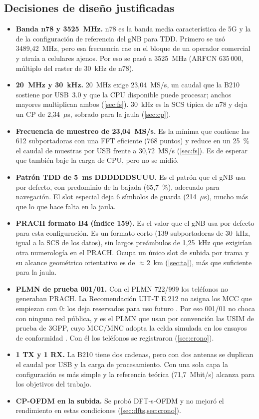 \subsection{Decisiones de diseño justificadas}
\begin{itemize}
  \item \textbf{Banda n78 y 3525~MHz.} n78 es la banda media característica de 5G y la de la configuración de referencia del gNB para TDD. Primero se usó 3489,42~MHz, pero esa frecuencia cae en el bloque de un operador comercial y atraía a celulares ajenos. Por eso se pasó a 3525~MHz (ARFCN 635\,000, múltiplo del raster de 30~kHz de n78).
  \item \textbf{20~MHz y 30~kHz.} 20~MHz exige 23,04~MS/s, un caudal que la B210 sostiene por USB~3.0 y que la CPU disponible puede procesar; anchos mayores multiplican ambos (\cref{sec:fs}). 30~kHz es la SCS típica de n78 y deja un CP de 2,34~$\mu$s, sobrado para la jaula (\cref{sec:cp}).
  \item \textbf{Frecuencia de muestreo de 23,04~MS/s.} Es la mínima que contiene las 612 subportadoras con una FFT eficiente (768 puntos) y reduce en un 25~\% el caudal de muestras por USB frente a 30,72~MS/s (\cref{sec:fs}). Es de esperar que también baje la carga de CPU, pero no se midió.
  \item \textbf{Patrón TDD de 5~ms DDDDDDSUUU.} Es el patrón que el gNB usa por defecto, con predominio de la bajada (65,7~\%), adecuado para navegación. El slot especial deja 6 símbolos de guarda (214~$\mu$s), mucho más que lo que hace falta en la jaula.
  \item \textbf{PRACH formato B4 (índice 159).} Es el valor que el gNB usa por defecto para esta configuración. Es un formato corto (139 subportadoras de 30~kHz, igual a la SCS de los datos), sin largos preámbulos de 1,25~kHz que exigirían otra numerología en el PRACH. Ocupa un único slot de subida por trama y su alcance geométrico orientativo es de $\approx 2$~km (\cref{sec:ta}), más que suficiente para la jaula.
  \item \textbf{PLMN de prueba 001/01.} Con el PLMN 722/999 los teléfonos no generaban PRACH. La Recomendación UIT-T E.212 no asigna los MCC que empiezan con 0: los deja reservados para uso futuro \cite{e212a}. Por eso 001/01 no choca con ninguna red pública, y es el PLMN que usan por convención las USIM de prueba de 3GPP, cuyo MCC/MNC adopta la celda simulada en los ensayos de conformidad \cite{ts38508}. Con él los teléfonos se registraron (\cref{sec:crono}).
  \item \textbf{1 TX y 1 RX.} La B210 tiene dos cadenas, pero con dos antenas se duplican el caudal por USB y la carga de procesamiento. Con una sola capa la configuración es más simple y la referencia teórica (71,7~Mbit/s) alcanza para los objetivos del trabajo.
  \item \textbf{CP-OFDM en la subida.} Se probó DFT-s-OFDM y no mejoró el rendimiento en estas condiciones (\cref{sec:dfts,sec:crono}).
\end{itemize}

